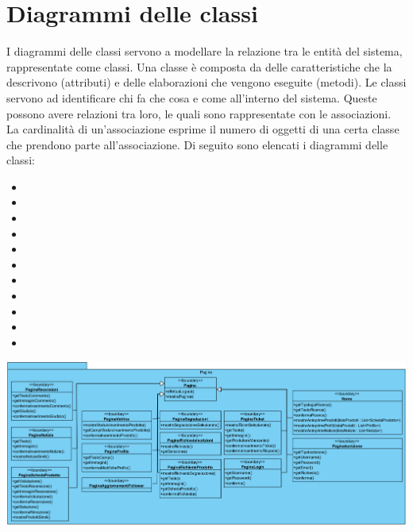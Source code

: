 \section{Diagrammi delle classi}  \label{cha:classi}
I diagrammi delle classi servono a modellare la relazione tra le entità del sistema, rappresentate come classi.
Una classe è composta da delle caratteristiche che la descrivono (attributi) e delle elaborazioni che vengono eseguite (metodi). 
Le classi servono ad identificare chi fa che cosa e come all’interno del sistema. Queste possono avere relazioni tra loro, le quali sono rappresentate con le associazioni. La cardinalità di un’associazione esprime il numero di oggetti di una certa classe che prendono parte all’associazione. Di seguito sono elencati i diagrammi delle classi:
\begin{itemize}
	\item {}
	\item {}
	\item {}
	\item {}
	\item {}
	\item {}
	\item {}
	\item {}
	\item {}
	\item {}
	\item {}
\end{itemize}


\begin{landscape}
\begin{center}
			\includegraphics[width=\linewidth]{assets/visualParadigm/classi/Pagine}
\end{center}
\end{landscape}

